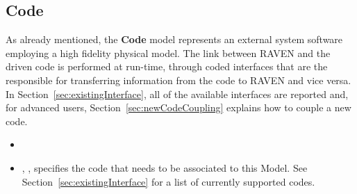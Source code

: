 \subsection{Code}
\label{subsec:models_code}
As already mentioned, the \textbf{Code} model represents an external system
software employing a high fidelity physical model.
%
The link between RAVEN and the driven code is performed at run-time, through
coded interfaces that are the responsible for transferring information from the
code to RAVEN and vice versa.
%
In Section~\ref{sec:existingInterface}, all of the available interfaces are
reported and, for advanced users, Section~\ref{sec:newCodeCoupling} explains how
to couple a new code.


%
\attrsIntro
%
\vspace{-5mm}
\begin{itemize}
  \itemsep0em
  \item \nameDescription
  \item {}, , specifies the
  code that needs to be associated to this Model.
  \nb See Section~\ref{sec:existingInterface} for a list of currently supported
  codes.
\end{itemize}
\vspace{-5mm}

